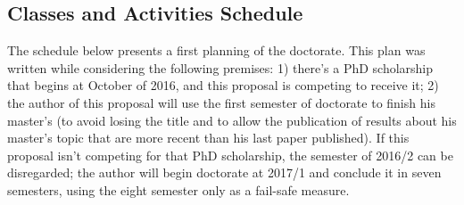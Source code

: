 \documentclass[english,plano-doutorado,twoside]{iiufrgs}
\begin{document}
\subsection{Classes and Activities Schedule}

The schedule below presents a first planning of the doctorate. This plan was written while considering the following premises: 1) there's a PhD scholarship that begins at October of 2016, and this proposal is competing to receive it; 2) the author of this proposal will use the first semester of doctorate to finish his master's (to avoid losing the title and to allow the publication of results about his master's topic that are more recent than his last paper published). If this proposal isn't competing for that PhD scholarship, the semester of 2016/2 can be disregarded; the author will begin doctorate at 2017/1 and conclude it in seven semesters, using the eight semester only as a fail-safe measure.
\end{document}

